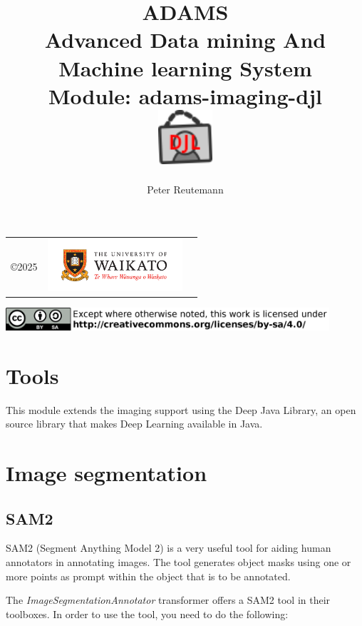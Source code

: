 \documentclass[a4paper]{book}
\title{
  \textbf{ADAMS} \\
  {\Large \textbf{A}dvanced \textbf{D}ata mining \textbf{A}nd \textbf{M}achine
  learning \textbf{S}ystem} \\
  {\Large Module: adams-imaging-djl} \\
  \vspace{1cm}
  \includegraphics[width=2cm]{images/imaging-djl-module.png} \\
}
\author{
  Peter Reutemann
}
\begin{document}
\begin{titlepage}
\maketitle

\thispagestyle{empty}
\center
\begin{table}[b]
	\begin{tabular}{c l l}
		\parbox[c][2cm]{2cm}{\copyright 2025} &
		\parbox[c][2cm]{5cm}{\includegraphics[width=5cm]{images/coat_of_arms.pdf}} \\
	\end{tabular}
	\includegraphics[width=12cm]{images/cc.png} \\
\end{table}

\end{titlepage}

\tableofcontents

\chapter{Tools}
This module extends the imaging support using the Deep Java Library\cite{djl}, an open source
library that makes Deep Learning available in Java.

\chapter{Image segmentation}
\section{SAM2}
SAM2\cite{sam2} (Segment Anything Model 2) is a very useful tool for aiding human annotators in
annotating images. The tool generates object masks using one or more points as prompt
within the object that is to be annotated.

The \textit{ImageSegmentationAnnotator} transformer offers a SAM2
tool in their toolboxes. In order to use the tool, you need to do the following:
\end{document}
